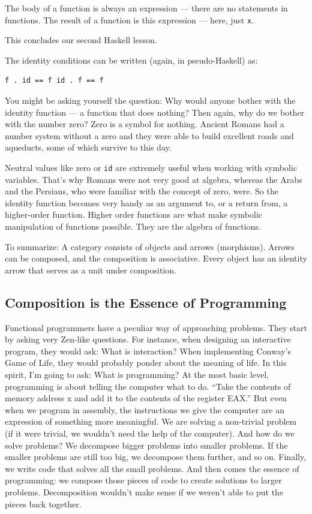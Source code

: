 The body of a function is always an expression --- there are no
statements in functions. The result of a function is this expression ---
here, just \texttt{x}.

This concludes our second Haskell lesson.

The identity conditions can be written (again, in pseudo-Haskell) as:

\begin{verbatim}
f . id == f id . f == f
\end{verbatim}

You might be asking yourself the question: Why would anyone bother with
the identity function --- a function that does nothing? Then again, why
do we bother with the number zero? Zero is a symbol for nothing. Ancient
Romans had a number system without a zero and they were able to build
excellent roads and aqueducts, some of which survive to this day.

Neutral values like zero or \texttt{id} are extremely useful when
working with symbolic variables. That's why Romans were not very good at
algebra, whereas the Arabs and the Persians, who were familiar with the
concept of zero, were. So the identity function becomes very handy as an
argument to, or a return from, a higher-order function. Higher order
functions are what make symbolic manipulation of functions possible.
They are the algebra of functions.

To summarize: A category consists of objects and arrows (morphisms).
Arrows can be composed, and the composition is associative. Every object
has an identity arrow that serves as a unit under composition.

\subsection{Composition is the Essence of
Programming}\label{composition-is-the-essence-of-programming}

Functional programmers have a peculiar way of approaching problems. They
start by asking very Zen-like questions. For instance, when designing an
interactive program, they would ask: What is interaction? When
implementing Conway's Game of Life, they would probably ponder about the
meaning of life. In this spirit, I'm going to ask: What is programming?
At the most basic level, programming is about telling the computer what
to do. ``Take the contents of memory address x and add it to the
contents of the register EAX.'' But even when we program in assembly,
the instructions we give the computer are an expression of something
more meaningful. We are solving a non-trivial problem (if it were
trivial, we wouldn't need the help of the computer). And how do we solve
problems? We decompose bigger problems into smaller problems. If the
smaller problems are still too big, we decompose them further, and so
on. Finally, we write code that solves all the small problems. And then
comes the essence of programming: we compose those pieces of code to
create solutions to larger problems. Decomposition wouldn't make sense
if we weren't able to put the pieces back together.

